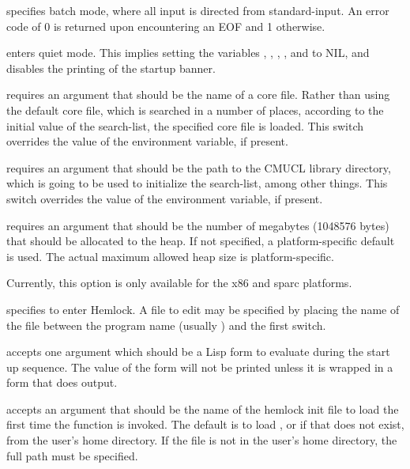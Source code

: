 \begin{Lentry}
\item[\code{-batch}] specifies batch mode, where all input is
  directed from standard-input.  An error code of 0 is returned upon
  encountering an EOF and 1 otherwise.

\item[\code{-quiet}] enters quiet mode. This implies setting the
  variables , ,
  , ,
   and  to NIL, and
  disables the printing of the startup banner.

\item[\code{-core}] requires an argument that should be the name of a
  core file.  Rather than using the default core file, which is searched
  in a number of places, according to the initial value of the
   search-list, the specified core file is loaded.  This
  switch overrides the value of the  environment variable,
  if present.
  
\item[\code{-lib}] requires an argument that should be the path to the
  CMUCL library directory, which is going to be used to initialize the
   search-list, among other things.  This switch overrides
  the value of the  environment variable, if present.

\item[\code{-dynamic-space-size}] requires an argument that should be
  the number of megabytes (1048576 bytes) that should be allocated to
  the heap.  If not specified, a platform-specific default is used.
  The actual maximum allowed heap size is platform-specific.

  Currently, this option is only available for the x86 and sparc
  platforms. 

\item[\code{-edit}] specifies to enter Hemlock.  A file to edit may be
  specified by placing the name of the file between the program name
  (usually ) and the first switch.
  
\item[\code{-eval}] accepts one argument which should be a Lisp form
  to evaluate during the start up sequence.  The value of the form
  will not be printed unless it is wrapped in a form that does output.
  
\item[\code{-hinit}] accepts an argument that should be the name of
  the hemlock init file to load the first time the function
   is invoked.  The default is to load
  , or if that does not exist,
   from the user's home directory.  If the
  file is not in the user's home directory, the full path must be
  specified.
  

\end{Lentry}
